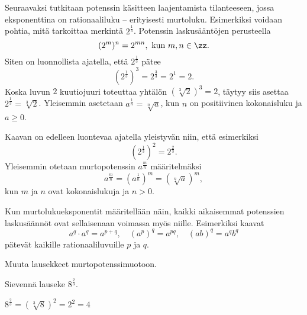 Seuraavaksi tutkitaan potenssin käsitteen laajentamista tilanteeseen, jossa eksponenttina on rationaaliluku – erityisesti murtoluku. Esimerkiksi voidaan pohtia, mitä tarkoittaa merkintä $2^\frac{1}{3}$. Potenssin laskusääntöjen perusteella
\[
(2^{m})^n = 2^{mn},\textrm{ kun }m,n\in \zz.
\]
Siten on luonnollista ajatella, että  $2^\frac{1}{3}$ pätee
\[
(2^\frac{1}{3})^3 = 2^\frac{3}{3} = 2^1=2.
\]
Koska luvun $2$ kuutiojuuri toteuttaa yhtälön $(\sqrt[3]{2})^3=2$, täytyy siis asettaa $2^\frac{1}{3}=\sqrt[3]{2}$. Yleisemmin asetetaan $a^\frac{1}{n} =\sqrt[n]{a}$, kun $n$ on positiivinen kokonaisluku ja $a\ge 0$.

Kaavan on edelleen luontevaa ajatella yleistyvän niin, että esimerkiksi
\[
(2^{\frac{1}{3}})^2 = 2^{\frac{2}{3}}.
\]
Yleisemmin otetaan murtopotenssin $a^\frac{m}{n}$ määritelmäksi
\[
a^\frac{m}{n} = (a^{\frac{1}{n}})^m = (\sqrt[n]{a})^m,
\]
kun $m$ ja $n$ ovat kokonaislukuja ja $n>0$. 


Kun murtolukueksponentit määritellään näin, kaikki aikaisemmat potenssien laskusäännöt ovat sellaisenaan voimassa myös niille. Esimerkiksi kaavat
\[ a^q\cdot a^q = a^{p+q}, \quad (a^p)^q = a^{pq}, \quad (ab)^q=a^qb^q \]
pätevät kaikille rationaaliluvuille $p$ ja $q$.


\begin{esimerkki}
Muuta lausekkeet murtopotenssimuotoon.

\begin{esimratk}
\end{esimratk}
\end{esimerkki}

\begin{esimerkki}
Sievennä lauseke $8^\frac{2}{3}$.

\begin{esimratk}
 $8^\frac{2}{3} = (\sqrt[3]{8})^2 = 2^2 = 4$
 \end{esimratk}
\end{esimerkki}
